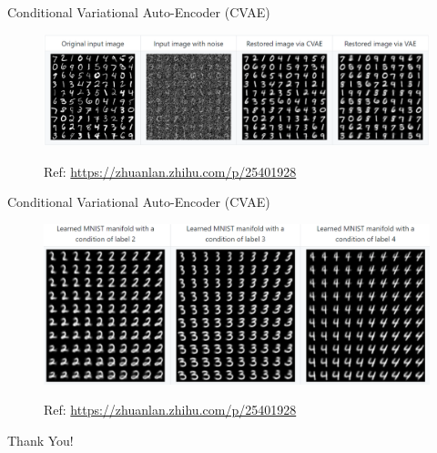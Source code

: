 \documentclass{beamer}
\begin{document}
\begin{frame}{Conditional Variational Auto-Encoder (CVAE)}
\begin{figure}
\includegraphics[width=.95\columnwidth]{fig/cvae_recon.png}
\begin{spacing}{1}
\textcolor[RGB]{185 181 205}{\small
Ref: \url{https://zhuanlan.zhihu.com/p/25401928}}
\end{spacing}
\end{figure}
\end{frame}
\begin{frame}{Conditional Variational Auto-Encoder (CVAE)}
\begin{figure}
\includegraphics[width=.9\columnwidth]{fig/cvae_condi.png}
\begin{spacing}{1}
\textcolor[RGB]{185 181 205}{\small
Ref: \url{https://zhuanlan.zhihu.com/p/25401928}}
\end{spacing}
\end{figure}
\end{frame}
\begin{frame}


\end{frame}
\begin{frame}
\begin{center}
{\LARGE Thank You!}
\end{center}
\end{frame}
\end{document}
